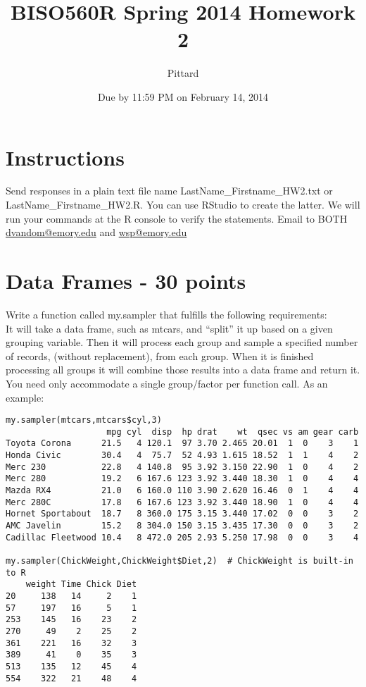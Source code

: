 \documentclass{article}
\begin{document}

\title{BISO560R Spring 2014 Homework 2}
\author{Pittard}
\date{Due by 11:59 PM on February 14, 2014}
\maketitle


\section*{Instructions}
Send responses in a plain text file name LastName\_Firstname\_HW2.txt or LastName\_Firstname\_HW2.R. You can use RStudio to create the latter. We will run your commands at the R console to verify the statements. Email to BOTH \url{dvandom@emory.edu} and \url{wsp@emory.edu}

\section{Data Frames - 30 points}Write a function called my.sampler that fulfills the following requirements:
\\
It will take a data frame, such as mtcars, and ``split'' it up based on a given grouping variable. Then it will process each group and sample a specified number of records, (without replacement), from each group. When it is finished processing all groups it will combine those results into a data frame and return it. You need only accommodate a single group/factor per function call. As an example:

\begin{verbatim}
my.sampler(mtcars,mtcars$cyl,3)
                    mpg cyl  disp  hp drat    wt  qsec vs am gear carb
Toyota Corona      21.5   4 120.1  97 3.70 2.465 20.01  1  0    3    1
Honda Civic        30.4   4  75.7  52 4.93 1.615 18.52  1  1    4    2
Merc 230           22.8   4 140.8  95 3.92 3.150 22.90  1  0    4    2
Merc 280           19.2   6 167.6 123 3.92 3.440 18.30  1  0    4    4
Mazda RX4          21.0   6 160.0 110 3.90 2.620 16.46  0  1    4    4
Merc 280C          17.8   6 167.6 123 3.92 3.440 18.90  1  0    4    4
Hornet Sportabout  18.7   8 360.0 175 3.15 3.440 17.02  0  0    3    2
AMC Javelin        15.2   8 304.0 150 3.15 3.435 17.30  0  0    3    2
Cadillac Fleetwood 10.4   8 472.0 205 2.93 5.250 17.98  0  0    3    4

my.sampler(ChickWeight,ChickWeight$Diet,2)  # ChickWeight is built-in to R
    weight Time Chick Diet
20     138   14     2    1
57     197   16     5    1
253    145   16    23    2
270     49    2    25    2
361    221   16    32    3
389     41    0    35    3
513    135   12    45    4
554    322   21    48    4
\end{verbatim}
\end{document}
